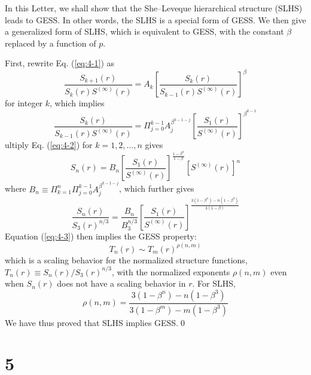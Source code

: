 \documentclass[12pt,a4]{ctexart}
\begin{document}
In this Letter, we shall show that the She--Leveque hierarchical structure (SLHS) leads to GESS. In other words, the SLHS is a special form of GESS. We then give a generalized form of SLHS, which is equivalent to GESS, with the constant $\beta$ replaced by a function of $p$.

First, rewrite Eq. (\ref{eq:4-1}) as
\begin{equation}
   \frac{S_{k+1}(r)}{S_{k}(r) S^{(\infty)}(r)}=A_{k}\left[\frac{S_{k}(r)}{S_{k-1}(r) S^{(\infty)}(r)}\right]^{\beta}
\end{equation}
for integer $k$, which implies
\begin{equation}
   \frac{S_{k}(r)}{S_{k-1}(r) S^{(\infty)}(r)}=\Pi_{j=0}^{k-1} A_{j}^{\beta^{k-1-j}}\left[\frac{S_{1}(r)}{S^{(\infty)}(r)}\right]^{\beta^{k-1}}
   \label{eq:4-2}
\end{equation}
ultiply Eq. (\ref{eq:4-2}) for $k=1,2, \ldots, n$ gives
\begin{equation}
   S_{n}(r)=B_{n}\left[\frac{S_{1}(r)}{S^{(\infty)}(r)}\right]^{\frac{1-\beta^{n}}{1-\beta}}\left[S^{(\infty)}(r)\right]^{n}
\end{equation}
where $B_{n} \equiv \Pi_{k=1}^{n} \Pi_{j=0}^{k-1} A_{j}^{\beta^{k-1-j}}$, which further gives
\begin{equation}
   \frac{S_{n}(r)}{S_{3}(r)^{n / 3}}=\frac{B_{n}}{B_{3}^{n / 3}}\left[\frac{S_{1}(r)}{S^{(\infty)}(r)}\right]^{\frac{3\left(1-\beta^{n}\right)-n\left(1-\beta^{3}\right)}{3(1-\beta)}}
   \label{eq:4-3}
\end{equation}
Equation (\ref{eq:4-3}) then implies the GESS property:
\begin{equation}
   T_{n}(r) \sim T_{m}(r)^{\rho(n, m)}
\end{equation}
which is a scaling behavior for the normalized structure functions, $T_{n}(r) \equiv S_{n}(r) / S_{3}(r)^{n / 3}$, with the normalized exponents $\rho(n, m)$ even when $S_{n}(r)$ does not have a scaling behavior in $r$. For SLHS,
\begin{equation}
   \rho(n, m)=\frac{3\left(1-\beta^{n}\right)-n\left(1-\beta^{3}\right)}{3\left(1-\beta^{m}\right)-m\left(1-\beta^{3}\right)}
\end{equation}
We have thus proved that SLHS implies GESS.\qed



\section{5}
\end{document}
